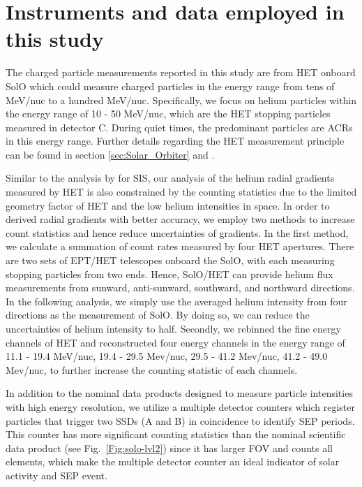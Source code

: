 \section{Instruments and data employed in this study}


The charged particle measurements reported in this study are from \ac{HET} onboard \ac{SolO} which could measure charged particles in the energy range from tens of MeV/nuc to a hundred MeV/nuc. Specifically, we focus on helium particles within the energy range of 10 - 50 MeV/nuc, which are the \ac{HET} stopping particles measured in detector C. During quiet times, the predominant particles are \acp{ACR} in this energy range. Further details regarding the \ac{HET} measurement principle can be found in section \ref{sec:Solar_Orbiter} and \citet{RodriguezPacheco-2019-EPD}.

Similar to the analysis by \citet{Mason-2021-SolOQuietTime} for \ac{SIS}, our analysis of the helium radial gradients measured by \ac{HET} is also constrained by the counting statistics due to the limited geometry factor of \ac{HET} and the low helium intensities in space. In order to derived radial gradients with better accuracy, we employ two methods to increase count statistics and hence reduce uncertainties of gradients. In the first method, we calculate a summation of count rates measured by four \ac{HET} apertures. There are two sets of \ac{EPT}/\ac{HET} telescopes onboard the \ac{SolO}, with each measuring stopping particles from two ends. Hence, \ac{SolO}/\ac{HET} can provide helium flux measurements from sunward, anti-sunward, southward, and northward directions. In the following analysis, we simply use the averaged helium intensity from four directions as the measurement of \ac{SolO}. By doing so, we can reduce the uncertainties of helium intensity to half. Secondly, we rebinned the fine energy channels of \ac{HET} and reconstructed four energy channels in the energy range of 11.1 - 19.4 MeV/nuc, 19.4 - 29.5 Mev/nuc, 29.5 - 41.2 Mev/nuc, 41.2 - 49.0 Mev/nuc, to further increase the counting statistic of each channels.



In addition to the nominal data products designed to measure particle intensities with high energy resolution, we utilize a multiple detector counters which register particles that trigger two \acp{SSD} (A and B) in coincidence to identify \ac{SEP} periods. This counter has more significant counting statistics than the nominal scientific data product (see Fig.~\ref{Fig:solo-lvl2}) since it has larger \ac{FOV} and counts all elements, which make the multiple detector counter an ideal indicator of solar activity and \ac{SEP} event. 

